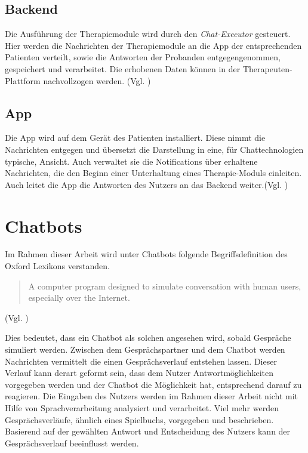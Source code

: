 \subsection{Backend}
Die Ausführung der Therapiemodule wird durch den \emph{Chat-Executor} gesteuert. Hier werden die Nachrichten der Therapiemodule an die App der entsprechenden Patienten verteilt, sowie die Antworten der Probanden entgegengenommen, gespeichert und verarbeitet. Die erhobenen Daten können in der Therapeuten-Plattform nachvollzogen werden. (Vgl. \cite[51\psq]{benjaminhoff})

\subsection{App}
Die App wird auf dem Gerät des Patienten installiert. Diese nimmt die Nachrichten entgegen und übersetzt die Darstellung in eine, für Chattechnologien typische, Ansicht. Auch verwaltet sie die Notifications über erhaltene Nachrichten, die den Beginn einer Unterhaltung eines Therapie-Moduls einleiten. Auch leitet die App die Antworten des Nutzers an das Backend weiter.(Vgl. \cite[51\psq]{benjaminhoff})

\section{Chatbots}

Im Rahmen dieser Arbeit wird unter Chatbots folgende Begriffsdefinition des Oxford Lexikons verstanden.

\begin{quote}A computer program designed to simulate conversation with human users, especially over the Internet.\end{quote}(Vgl. \cite{chatbotD24:online})

Dies bedeutet, dass ein Chatbot als solchen angesehen wird, sobald Gespräche simuliert werden. Zwischen dem Gesprächspartner und dem Chatbot werden Nachrichten vermittelt die einen Gesprächsverlauf entstehen lassen. Dieser Verlauf kann derart geformt sein, dass dem Nutzer Antwortmöglichkeiten vorgegeben werden und der Chatbot die Möglichkeit hat, entsprechend darauf zu reagieren. Die Eingaben des Nutzers werden im Rahmen dieser Arbeit nicht mit Hilfe von Sprachverarbeitung analysiert und verarbeitet. Viel mehr werden Gesprächsverläufe, ähnlich eines Spielbuchs, vorgegeben und beschrieben. Basierend auf der gewählten Antwort und Entscheidung des Nutzers kann der Gesprächsverlauf beeinflusst werden.